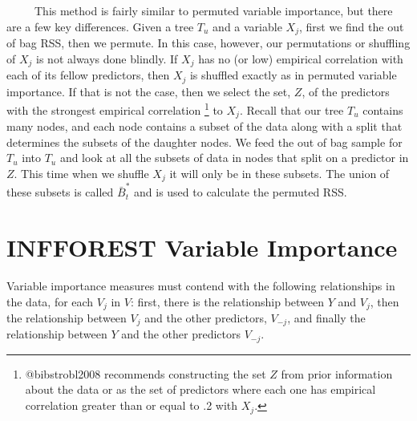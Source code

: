 \documentclass[12pt,twoside]{reedthesis}
\begin{document}
  ~~~~~This method is fairly similar to permuted variable importance, but
  there are a few key differences. Given a tree \(T_u\) and a variable
  \(X_j\), first we find the out of bag RSS, then we permute. In this
  case, however, our permutations or shuffling of \(X_j\) is not always
  done blindly. If \(X_j\) has no (or low) empirical correlation with each
  of its fellow predictors, then \(X_j\) is shuffled exactly as in
  permuted variable importance. If that is not the case, then we select
  the set, \(Z\), of the predictors with the strongest empirical
  correlation \footnote{@bibstrobl2008 recommends constructing the set
    \(Z\) from prior information about the data or as the set of
    predictors where each one has empirical correlation greater than or
    equal to .2 with \(X_j\).} to \(X_j\). Recall that our tree \(T_u\)
  contains many nodes, and each node contains a subset of the data along
  with a split that determines the subsets of the daughter nodes. We feed
  the out of bag sample for \(T_u\) into \(T_u\) and look at all the
  subsets of data in nodes that split on a predictor in \(Z\). This time
  when we shuffle \(X_j\) it will only be in these subsets. The union of
  these subsets is called \(\bar{B}_t^*\) and is used to calculate the
  permuted RSS.
  
  \chapter{INFFOREST Variable
  Importance}\label{infforest-variable-importance}
  
  Variable importance measures must contend with the following
  relationships in the data, for each \(V_j\) in \(V\): first, there is
  the relationship between \(Y\) and \(V_j\), then the relationship
  between \(V_j\) and the other predictors, \(V_{-j}\), and finally the
  relationship between \(Y\) and the other predictors \(V_{-j}\).
  
  \usetikzlibrary{positioning}
  
  \begin{center}
  \end{center}
  
\end{document}
